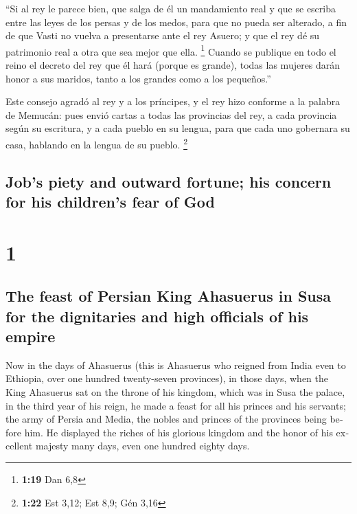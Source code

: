 \begin{paracol}{2}
 ``Si al rey le parece bien, que salga de él un
mandamiento real y que se escriba entre las leyes de los persas y de los
medos, para que no pueda ser alterado, a fin de que Vasti no vuelva a
presentarse ante el rey Asuero; y que el rey dé su patrimonio real a
otra que sea mejor que ella. \footnote{\textbf{1:19} Dan 6,8}
 Cuando se publique en todo el reino el decreto del rey
que él hará (porque es grande), todas las mujeres darán honor a sus
maridos, tanto a los grandes como a los pequeños.''

 Este consejo agradó al rey y a los príncipes, y el rey
hizo conforme a la palabra de Memucán:  pues envió cartas
a todas las provincias del rey, a cada provincia según su escritura, y a
cada pueblo en su lengua, para que cada uno gobernara su casa, hablando
en la lengua de su pueblo. \footnote{\textbf{1:22} Est 3,12; Est 8,9;
  Gén 3,16}

\switchcolumn
\begin{otherlanguage}{english}

\hypertarget{jobs-piety-and-outward-fortune-his-concern-for-his-childrens-fear-of-god}{%
\subsection{Job's piety and outward fortune; his concern for his
children's fear of
God}\label{jobs-piety-and-outward-fortune-his-concern-for-his-childrens-fear-of-god}}

\hypertarget{section-1}{%
\section{1}\label{section-1}}

\hypertarget{the-feast-of-persian-king-ahasuerus-in-susa-for-the-dignitaries-and-high-officials-of-his-empire}{%
\subsection{The feast of Persian King Ahasuerus in Susa for the
dignitaries and high officials of his
empire}\label{the-feast-of-persian-king-ahasuerus-in-susa-for-the-dignitaries-and-high-officials-of-his-empire}}

 Now in the days of Ahasuerus (this is Ahasuerus who
reigned from India even to Ethiopia, over one hundred twenty-seven
provinces),  in those days, when the King Ahasuerus sat on
the throne of his kingdom, which was in Susa the palace, 
in the third year of his reign, he made a feast for all his princes and
his servants; the army of Persia and Media, the nobles and princes of
the provinces being before him.  He displayed the riches
of his glorious kingdom and the honor of his excellent majesty many
days, even one hundred eighty days.


\end{otherlanguage}
\end{paracol}
